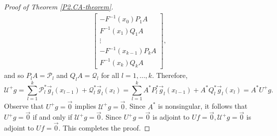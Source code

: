 \documentclass[10pt,reqno,oneside,a4paper]{article}
\begin{document}
\begin{proof}[Proof of Theorem \ref{P2.CA-theorem}]
\begin{align*}
\begin{bmatrix} 
-F^{-1}(x_0) P_1A \\
F^{-1}(x_1)Q_1A \\
\vdots \\
-F^{-1}(x_{k-1})P_kA \\
F^{-1}(x_k)Q_k A
\end{bmatrix}  ,
\end{align*}
and so $P_lA  = \mathcal{P}_l $ and $Q_l  A = \mathcal{Q}_l$ for all $l = 1,\ldots, k.$ Therefore,
\[ \mathcal{U}^+ g = \sum^k_{l=1} \mathcal{P}^*_l \vec{g}_l(x_{l-1}) + \mathcal{Q}^*_l \vec{g}_l(x_l) =  \sum^k_{l=1} A^*P_l^* \vec{g}_l(x_{l-1}) + A^*Q_l^*  \vec{g}_l(x_l) = A^*U^+ g.\]
Observe that $U^+ g = \vec{0}$ implies $\mathcal{U}^+ g = \vec{0}.$ Since $A^*$ is nonsingular, it follows that $U^+ g = \vec{0}$ if and only if $\mathcal{U}^+ g = \vec{0}.$ Since $U^+ g= \vec{0}$ is adjoint to $Uf= \vec{0}, \mathcal{U}^+ g= \vec{0}$ is adjoint to $Uf= \vec{0}.$ This completes the proof. 
\end{proof}
\end{document}
